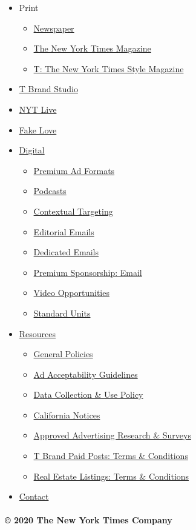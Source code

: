 \begin{itemize}
\tightlist
\item
  Print

  \begin{itemize}
  \tightlist
  \item
    \href{/newspaper}{Newspaper}
  \item
    \href{/nytmag}{The New York Times Magazine}
  \item
    \href{/t}{T: The New York Times Style Magazine}
  \end{itemize}
\item
  \href{http://www.tbrandstudio.com/}{T Brand Studio}
\item
  \href{http://nytconferences.com/}{NYT Live}
\item
  \href{http://fakelove.tv/}{Fake Love}
\item
  \href{/digital}{Digital}

  \begin{itemize}
  \tightlist
  \item
    \href{/proprietary-library}{Premium Ad Formats}
  \item
    \href{/podcasts}{Podcasts}
  \item
    \href{/contextual-targeting}{Contextual Targeting}
  \item
    \href{/editorial-sponsorships}{Editorial Emails}
  \item
    \href{/dedicated-emails}{Dedicated Emails}
  \item
    \href{/premium-sponsorship-email}{Premium Sponsorship: Email}
  \item
    \href{/video-opportunities}{Video Opportunities}
  \item
    \href{/standard-units}{Standard Units}
  \end{itemize}
\item
  \href{/general-resources}{Resources}

  \begin{itemize}
  \tightlist
  \item
    \href{/general-resources?id=general-policies}{General Policies}
  \item
    \href{/general-resources?id=ad-acceptability-guidelines}{Ad
    Acceptability Guidelines}
  \item
    \href{/general-resources?id=data-collection-and-use}{Data Collection
    \& Use Policy}
  \item
    \href{http://www.nytimes.com/privacy/california-notice}{California
    Notices}
  \item
    \href{/general-resources?id=approved-advertising-research-and-surveys}{Approved
    Advertising Research \& Surveys}
  \item
    \href{/general-resources?id=t-brand-paid-post-terms}{T Brand Paid
    Posts: Terms \& Conditions}
  \item
    \href{/general-resources?id=real-estate-listings-terms-and-conditions}{Real
    Estate Listings: Terms \& Conditions}
  \end{itemize}
\item
  \href{/}{Contact}
\end{itemize}

\hypertarget{-2020-the-new-york-times-company}{%
\paragraph{© 2020 The New York Times
Company}\label{-2020-the-new-york-times-company}}
